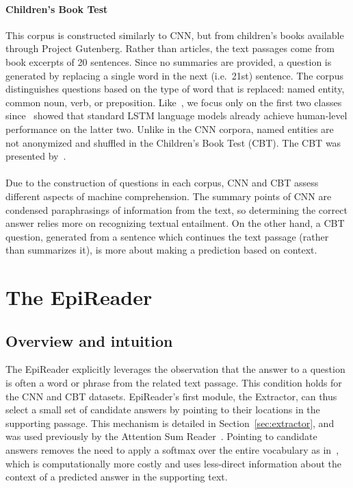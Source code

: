 \documentclass[11pt,letterpaper]{article}
\begin{document}
\paragraph{Children's Book Test} This corpus is constructed similarly to CNN, but from children's books available through Project Gutenberg. Rather than articles, the text passages come from book excerpts of 20 sentences. Since no summaries are provided, a question is generated by replacing a single word in the next (i.e.~21st) sentence. The corpus distinguishes questions based on the type of word that is replaced: named entity, common noun, verb, or preposition. Like~, we focus only on the first two classes since~ showed that standard LSTM language models already achieve human-level performance on the latter two. Unlike in the CNN corpora, named entities are not anonymized and shuffled in the Children's Book Test (CBT). The CBT was presented by~.

\paragraph{} Due to the construction of questions in each corpus, CNN and CBT assess different aspects of machine comprehension. The summary points of CNN are condensed paraphrasings of information from the text, so determining the correct answer relies more on recognizing textual entailment. On the other hand, a CBT question, generated from a sentence which continues the text passage (rather than summarizes it), is more about making a prediction based on context.

\section{The EpiReader}
\label{sec:epireader}
\subsection{Overview and intuition}
The EpiReader explicitly leverages the observation that the answer to a question is often a word or phrase from the related text passage. This condition holds for the CNN and CBT datasets. EpiReader's first module, the Extractor, can thus select a small set of candidate answers by pointing to their locations in the supporting passage. This mechanism is detailed in Section~\ref{sec:extractor}, and was used previously by the Attention Sum Reader~\cite{kadlec2016}. Pointing to candidate answers removes the need to apply a softmax over the entire vocabulary as in~, which is computationally more costly and uses less-direct information about the context of a predicted answer in the supporting text.
\end{document}
